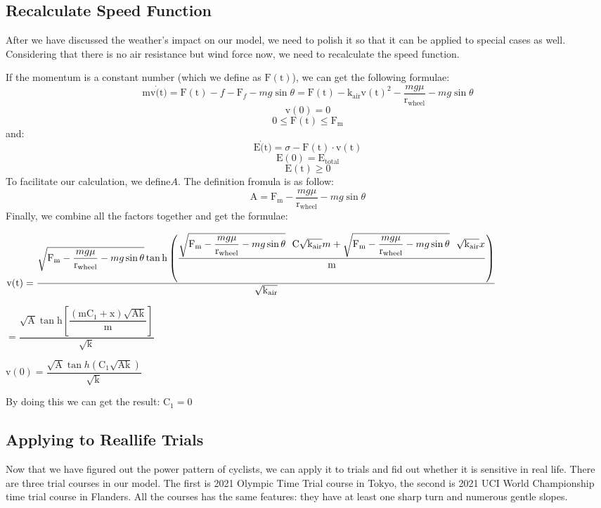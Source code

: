 \documentclass{article}
\begin{document}
	\subsection{Recalculate Speed Function}
	After we have discussed the weather's impact on our model, we need to polish it so that it can be applied to special cases as well. Considering that there is no air resistance but wind force now, we need to recalculate the speed function.

	If the momentum is a constant number (which we define as $\mathrm{F}(\mathrm{t})$), we can get the following formulae:
	$$\mathrm{m}\mathrm{v}\dot(\mathrm{t})=\mathrm{F}(\mathrm{t})-f-\mathrm{F}_{f}-mg\sin \theta=\mathrm{F}(\mathrm{t})-\mathrm{k}_\mathrm{air}{\mathrm{v}(\mathrm{t})}^2-\dfrac{mg\mu}{\mathrm{r}_\mathrm{wheel}}-mg\sin \theta$$
	$$\mathrm{v}(0)=0$$
	$$0\leq\mathrm{F}(\mathrm{t})\leq\mathrm{F}_\mathrm{m}$$
	and:
	$$\mathrm{E}\dot(\mathrm{t})=\sigma-\mathrm{F}(\mathrm{t})\cdot\mathrm{v}(\mathrm{t})$$
	$$\mathrm{E}(0)=\mathrm{E}_\mathrm{total}$$
	$$\mathrm{E}(\mathrm{t})\geq0$$
	To facilitate our calculation, we define$A$. The definition fromula is as follow:
	$$\mathrm{A}=\mathrm{F}_\mathrm{m}-\dfrac{mg\mu}{\mathrm{r}_\mathrm{wheel}}-mg\sin \theta$$
	Finally, we combine all the factors together and get the formulae:

	\begin{footnotesize}
		$\mathrm{v}(\mathrm{t})\\=\dfrac{\sqrt{\mathrm{F}_\mathrm{m}-\dfrac{mg\mu}{\mathrm{r}_\mathrm{wheel}}-mg\sin \theta} \tan \mathrm{h} \left(\dfrac{\sqrt{\mathrm{F}_\mathrm{m}-\dfrac{mg\mu}{\mathrm{r}_\mathrm{wheel}}-mg\sin \theta}\ \ \mathrm{C}\sqrt{\mathrm{k}_\mathrm{air}} m+\sqrt{\mathrm{F}_\mathrm{m}-\dfrac{mg\mu}{\mathrm{r}_\mathrm{wheel}}-mg\sin \theta}\ \ \sqrt{\mathrm{k}_\mathrm{air}} x}{\mathrm{m}}\right)}{\sqrt{\mathrm{k}_\mathrm{air}}}$

		$=\dfrac{\sqrt{\mathrm{A}} \tan \mathrm{h}\left[\dfrac{\left(\mathrm{m}\mathrm{C}_1+\mathrm{x}\right)\sqrt{\mathrm{Ak}}}{\mathrm{m}}\right]}{\sqrt{\mathrm{k}}}$
	\end{footnotesize}

	$\mathrm{v}(0)=\dfrac{\sqrt{\mathrm{A}} \tan h \left(\mathrm{C}_1\sqrt{\mathrm{Ak}}\right)}{\sqrt{\mathrm{k}}}$

	By doing this we can get the result: $\mathrm{C}_1=0$
	\subsection{Applying to Reallife Trials}
	Now that we have figured out the power pattern of cyclists, we can apply it to trials and fid out whether it is sensitive in real life. There are three trial courses in our model. The first is 2021 Olympic Time Trial course in Tokyo, the second is 2021 UCI World Championship time trial course in Flanders. All the courses has the same features: they have at least one sharp turn and numerous gentle slopes.
\end{document}
